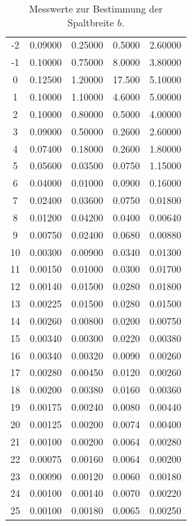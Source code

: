 \begin{table}[H]
\begin{tabular}{c || c | c | c | c}
    -2	& 0.09000 & 0.25000 & 0.5000 & 2.60000 \\
    -1	& 0.10000 & 0.75000 & 8.0000 & 3.80000 \\
    0	  & 0.12500 & 1.20000 & 17.500 & 5.10000 \\
    1	  & 0.10000 & 1.10000 & 4.6000 & 5.00000 \\
    2	  & 0.10000 & 0.80000 & 0.5000 & 4.00000 \\
    3	  & 0.09000 & 0.50000 & 0.2600 & 2.60000 \\
    4	  & 0.07400 & 0.18000 & 0.2600 & 1.80000 \\
    5	  & 0.05600 & 0.03500 & 0.0750 & 1.15000 \\
    6	  & 0.04000 & 0.01000 & 0.0900 & 0.16000 \\
    7	  & 0.02400 & 0.03600 & 0.0750 & 0.01800 \\
    8	  & 0.01200 & 0.04200 & 0.0400 & 0.00640 \\
    9	  & 0.00750 & 0.02400 & 0.0680 & 0.00880 \\
    10	& 0.00300 & 0.00900 & 0.0340 & 0.01300 \\
    11	& 0.00150 & 0.01000 & 0.0300 & 0.01700 \\
    12	& 0.00140 & 0.01500 & 0.0280 & 0.01800 \\
    13	& 0.00225 & 0.01500 & 0.0280 & 0.01500 \\
    14	& 0.00260 & 0.00800 & 0.0200 & 0.00750 \\
    15	& 0.00340 & 0.00300 & 0.0220 & 0.00380 \\
    16	& 0.00340 & 0.00320 & 0.0090 & 0.00260 \\
    17	& 0.00280 & 0.00450 & 0.0120 & 0.00260 \\
    18	& 0.00200 & 0.00380 & 0.0160 & 0.00360 \\
    19	& 0.00175 & 0.00240 & 0.0080 & 0.00440 \\
    20	& 0.00125 & 0.00200 & 0.0074 & 0.00400 \\
    21	& 0.00100 & 0.00200 & 0.0064 & 0.00280 \\
    22	& 0.00075 & 0.00160 & 0.0064 & 0.00200 \\
    23	& 0.00090 & 0.00120 & 0.0060 & 0.00180 \\
    24	& 0.00100 & 0.00140 & 0.0070 & 0.00220 \\
    25	& 0.00100 & 0.00180 & 0.0065 & 0.00250 \\
    \bottomrule
  \end{tabular}
  \caption{Messwerte zur Bestimmung der Spaltbreite $b$.}
  \label{tab:Spalt}
\end{table}

